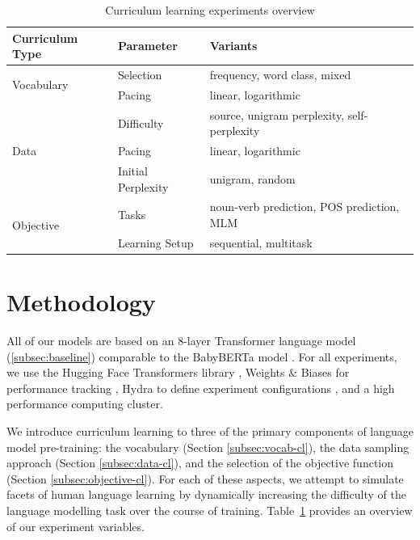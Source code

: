 \begin{table}
\vspace{-10mm}
\centering
\small
\begin{tabular}{lll}
\toprule
\textbf{Curriculum Type} & \textbf{Parameter} &\textbf{Variants} \\
\midrule
 \multirow{2}{*}{Vocabulary} & Selection & frequency, word class, mixed \\
 & Pacing & linear, logarithmic \\
 \midrule
 \multirow{3}{*}{Data} & Difficulty & source, unigram perplexity, self-perplexity \\
 & Pacing & linear, logarithmic \\
 & Initial Perplexity & unigram, random \\
  \midrule
 \multirow{2}{*}{Objective} & Tasks & noun-verb prediction, POS prediction, MLM\\
 & Learning Setup & sequential, multitask \\
\bottomrule
\end{tabular}
\caption{\label{tbl:configurations} Curriculum learning experiments overview}
\end{table}


\section{Methodology}

All of our models are based on an 8-layer Transformer language model (\cref{subsec:baseline}) comparable to the BabyBERTa model \cite{huebner2021babyberta}. 
For all experiments, we use the Hugging Face Transformers library \cite{transformers}, Weights \& Biases for performance tracking \cite{wandb}, Hydra to define experiment configurations \cite{hydra}, and a high performance computing cluster.

We introduce curriculum learning to three of the primary components of language model pre-training: the vocabulary (Section \ref{subsec:vocab-cl}), the data sampling approach (Section \ref{subsec:data-cl}), and the selection of the objective function (Section \ref{subsec:objective-cl}). For each of these aspects, we attempt to simulate facets of human language learning by dynamically increasing the difficulty of the language modelling task over the course of training. Table~\ref{tbl:configurations} provides an overview of our experiment variables.


